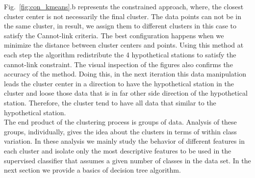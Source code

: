 {	Fig.~\ref{fig:con_kmeans}.b represents the constrained \kmeans{} approach, where, the closest cluster center is not necessarily the final cluster. The data points can not be in the same cluster, in result,  we assign them to different clusters in this case to satisfy the Cannot-link criteria. The best configuration happens when we minimize the distance between cluster centers and points. Using this method at each step the algorithm redistribute the 4 hypothetical stations to satisfy the cannot-link constraint. The visual inspection of the figures also confirms the accuracy of the method. Doing this, in the next iteration this data manipulation leads the cluster center in a direction to have the hypothetical station in the cluster and loose those data that is in far other side direction of the hypothetical station. Therefore, the cluster tend to have all data that similar to the hypothetical station. \\
	The end product of the clustering process is groups of data. Analysis of these groups, individually, gives the idea about the clusters in terms of within class variation. In these analysis we mainly study the behavior of different features in each cluster and isolate only the most descriptive features to be used in the supervised classifier that assumes a given number of classes in the data set. In the next section we provide a basics of decision tree algorithm. 

}

